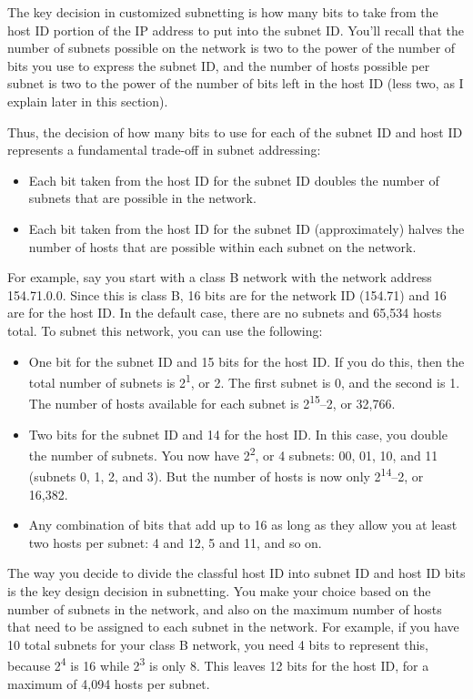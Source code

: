 \documentclass[b5paper,11pt]{memoir}
\begin{document}
The key decision in customized subnetting is how many bits to take from
the host ID portion of the
\protect\hypertarget{ch18s05.htmlux5cux23idx-CHP-18-0737}{}{}IP address
to put into the subnet ID. You'll recall that the number of subnets
possible on the network is two to the power of the number of bits you
use to express the subnet ID, and the number of hosts possible per
subnet is two to the power of the number of bits left in the host ID
(less two, as I explain later in this section).

Thus, the decision of how many bits to use for each of the subnet ID and
host ID represents a fundamental trade-off in subnet addressing:

\begin{itemize}
\item
  Each bit taken from the host ID for the subnet ID doubles the number
  of subnets that are possible in the network.
\item
  Each bit taken from the host ID for the subnet ID (approximately)
  halves the number of hosts that are possible within each subnet on the
  network.
\end{itemize}

For example, say you start with a class B network with the network
address 154.71.0.0. Since this is class B, 16 bits are for the network
ID (154.71) and 16 are for the host ID. In the default case, there are
no subnets and 65,534 hosts total. To subnet this network, you can use
the following:

\begin{itemize}
\item
  One bit for the subnet ID and 15 bits for the host ID. If you do this,
  then the total number of subnets is 2\textsuperscript{1}, or 2. The
  first subnet is 0, and the second is 1. The number of hosts available
  for each subnet is 2\textsuperscript{15}--2, or 32,766.
\item
  Two bits for the subnet ID and 14 for the host ID. In this case, you
  double the number of subnets. You now have 2\textsuperscript{2}, or 4
  subnets: 00, 01, 10, and 11 (subnets 0, 1, 2, and 3). But the number
  of hosts is now only 2\textsuperscript{14}--2, or 16,382.
\item
  Any combination of bits that add up to 16 as long as they allow you at
  least two hosts per subnet: 4 and 12, 5 and 11, and so on.
\end{itemize}

The way you decide to divide the classful host ID into subnet ID and
host ID bits is the key design decision in subnetting. You make your
choice based on the number of subnets in the network, and also on the
maximum number of hosts that need to be assigned to each subnet in the
network. For example, if you have 10 total subnets for your class B
network, you need 4 bits to represent this, because 2\textsuperscript{4}
is 16 while 2\textsuperscript{3} is only 8. This leaves 12 bits for the
host ID, for a maximum of 4,094 hosts per subnet.
\end{document}
